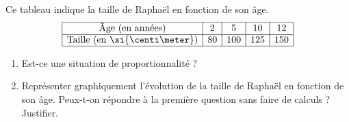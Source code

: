 
\begin{exercice}\label{exosmath-0949}

Ce tableau indique la taille de Raphaël en fonction de son âge.
\begin{equation*}
    \begin{array}[]{|c|c|c|c|c|}
        \hline
        \text{Âge (en années)}&2&5&10&12\\
        \hline
        \text{Taille (en \si{\centi\meter})}&80&100&125&150\\
        \hline
    \end{array}
\end{equation*}
 \begin{enumerate}
     \item
Est-ce une situation de proportionnalité ?
\item
 Représenter graphiquement l'évolution de la taille de Raphaël en fonction de son âge. Peux-t-on répondre à la première question sans faire de calculs ?  Justifier.
 \end{enumerate}

\end{exercice}
